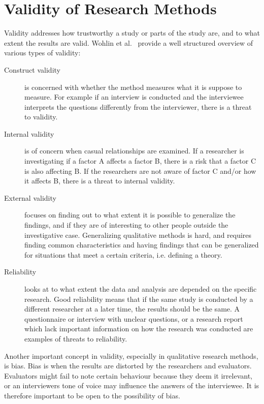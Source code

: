 \section{Validity of Research Methods}
\label{subsec:threatsValidity}
Validity addresses how trustworthy a study or parts of the study are, and to what extent the results are valid. Wohlin et al.~\cite{experimentInSE} provide a well structured overview of various types of validity:
\begin{description}
  \item[Construct validity] is concerned with whether the method measures what it is suppose to measure. For example if an interview is conducted and the interviewee interprets the questions differently from the interviewer, there is a threat to validity.

  \item[Internal validity] is of concern when casual relationships are examined. If a researcher is investigating if a factor A affects a factor B, there is a risk that a factor C is also affecting B. If the researchers are not aware of factor C and/or how it affects B, there is a threat to internal validity.

  \item[External validity] focuses on finding out to what extent it is possible to generalize the findings, and if they are of interesting to other people outside the investigative case. Generalizing qualitative methods is hard, and requires finding common characteristics and having findings that can be generalized for situations that meet a certain criteria, i.e. defining a theory.

  \item[Reliability] looks at to what extent the data and analysis are depended on the specific research. Good reliability means that if the same study is conducted by a different researcher at a later time, the results should be the same. A questionnaire or interview with unclear questions, or a research report which lack important information on how the research was conducted are examples of threats to reliability.
\end{description}


Another important concept in validity, especially in qualitative research methods, is bias. Bias is when the results are distorted by the researchers and evaluators. Evaluators might fail to note certain behaviour because they deem it irrelevant, or an interviewers tone of voice may influence the answers of the interviewee. It is therefore important to be open to the possibility of bias.

